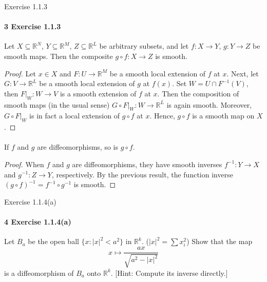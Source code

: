 \documentclass[12pt]{article}
\newlength{\myparskip}
\newenvironment{fullbox}{\begin{lrbox}{\savefullbox}\begin{minipage}{\dimexpr\textwidth-2\fboxsep\relax}\setlength{\parskip}{\myparskip}}{\end{minipage}\end{lrbox}\framebox[\textwidth]{\usebox{\savefullbox}}}
\newenvironment{pbox}[1][]{\begin{fullbox}\ifx#1\empty\else\paragraph{#1}\phantom{}\fi}{\end{fullbox}}
\theoremstyle{definition}
\newcommand{\R}{\mathbb{R}}
\newcommand{\<}{\langle}
\renewcommand{\>}{\rangle}
\newcommand{\seq}{\subseteq}
\begin{document}
\begin{pbox}[3 Exercise 1.1.3]
    Let $X \seq \R^N$, $Y \seq \R^M$, $Z \seq \R^L$ be arbitrary subsets, and let $f : X \to Y$, $g : Y \to Z$ be smooth maps.
    Then the composite $g \circ f : X \to Z$ is smooth.
\end{pbox}

\begin{proof}
    Let $x \in X$ and $F : U \to \R^M$ be a smooth local extension of $f$ at $x$.
    Next, let $G : V \to \R^L$ be a smooth local extension of $g$ at $f(x)$.
    Set $W = U \cap F^{-1}(V)$, then $F|_W : W \to V$ is a smooth extension of $f$ at $x$.
    Then the composition of smooth maps (in the usual sense) $G \circ F|_W : W \to \R^L$ is again smooth.
    Moreover, $G \circ F|_W$ is in fact a local extension of $g \circ f$ at $x$.
    Hence, $g \circ f$ is a smooth map on $X$.
\end{proof}


\newpage
\begin{pbox}[]
    If $f$ and $g$ are diffeomorphisms, so is $g \circ f$.
\end{pbox}

\begin{proof}
    When $f$ and $g$ are diffeomorphisms, they have smooth inverses $f^{-1} : Y \to X$ and $g^{-1} : Z \to Y$, respectively.
    By the previous result, the function inverse $(g \circ f)^{-1} = f^{-1} \circ g^{-1}$ is smooth.
\end{proof}


\begin{pbox}[4 Exercise 1.1.4(a)]
    Let $B_a$ be the open ball $\{x : |x|^2 < a^2\}$ in $\R^k$.
    ($|x|^2 = \sum x_i^2$) Show that the map
    \[
        x \longmapsto \frac{ax}{\sqrt{a^2 - |x|^2}}
    \]
    is a diffeomorphism of $B_a$ onto $\R^k$.
    [Hint: Compute its inverse directly.]
\end{pbox}
\end{document}
